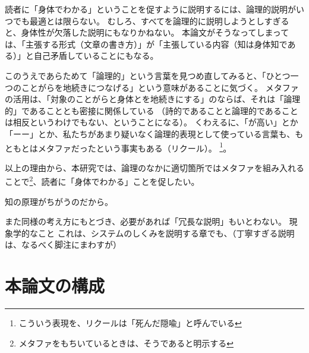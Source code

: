 読者に「身体でわかる」ということを促すように説明するには、論理的説明がいつでも最適とは限らない。
むしろ、すべてを論理的に説明しようとしすぎると、身体性が欠落した説明にもなりかねない。
本論文がそうなってしまっては、「主張する形式（文章の書き方）」が「主張している内容（知は身体知である）」と自己矛盾していることにもなる。


このうえであらためて「論理的」という言葉を見つめ直してみると、「ひとつ一つのことがらを地続きにつなげる」という意味があることに気づく。
メタファの活用は、「対象のことがらと身体とを地続きにする」のならば、それは「論理的」であることとも密接に関係している
（詩的であることと論理的であることは相反というわけでもない、ということになる）。
くわえるに、「が高い」とか「ーー」とか、私たちがあまり疑いなく論理的表現として使っている言葉も、もともとはメタファだったという事実もある（リクール）。
\footnote{こういう表現を、リクールは「死んだ隠喩」と呼んでいる}。

以上の理由から、本研究では、論理のなかに適切箇所ではメタファを組み入れることで\footnote{メタファをもちいているときは、そうであると明示する}、読者に「身体でわかる」ことを促したい。

知の原理がちがうのだから。

また同様の考え方にもとづき、必要があれば「冗長な説明」もいとわない。
現象学的なこと
これは、システムのしくみを説明する章でも、（丁寧すぎる説明は、なるべく脚注にまわすが）


\section{本論文の構成}





